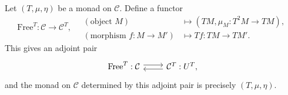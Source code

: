 \begin{definition-proposition}\label{def:free-T-Alg}
	Let $(T,\mu,\eta)$ be a monad on $\mathcal{C}$. Define a functor
	\[ \mathrm{Free}^T: \mathcal{C} \to \mathcal{C}^T , \quad
	\begin{array}{rl}
		(\text{object } M) & \mapsto (TM, \mu_M: T^2 M \to TM), \\
		(\text{morphism } f: M \to M') & \mapsto Tf: TM \to TM'.
	\end{array}\]
	This gives an adjoint pair
	\[\begin{tikzcd}
		\mathrm{Free}^T : \mathcal{C} \arrow[shift left, r] & \mathcal{C}^T: U^T \arrow[shift left, l],
	\end{tikzcd}\]
	and the monad on $\mathcal{C}$ determined by this adjoint pair is precisely
	$(T,\mu,\eta)$.
\end{definition-proposition}
